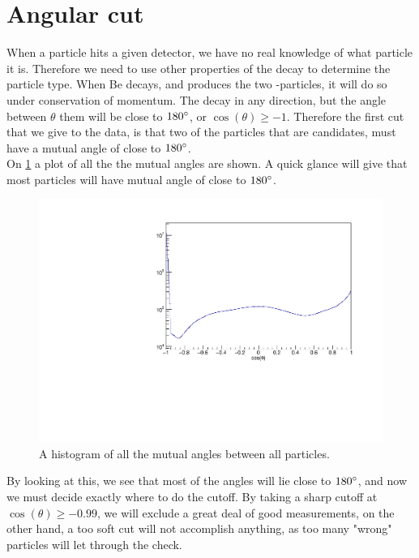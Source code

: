 \section{Angular cut}
When a particle hits a given detector, we have no real knowledge of what particle it is. 
Therefore we need to use other properties of the decay to determine the particle type. 
When \isotope[8][]Be decays, and produces the two \al-particles, it will do so under conservation of momentum. The decay in any direction, but the angle between $\theta$ them will be close to  $180\degree$, or $\cos(\theta) \geq -1$. Therefore the first cut that we give to the data, is that two of the particles that are \al candidates, must have a mutual angle of close to $180\degree$.\\


On \cref{fig:cosAll} a plot of all the the mutual angles are shown. A quick glance will give that most particles will have mutual angle of close to $180\degree$. 

\begin{figure}[h]
	\centering
	\includegraphics[width=\linewidth]{../figures/cosang.pdf}
	\caption{A histogram of all the mutual angles between all particles.}
	\label{fig:cosAll}
\end{figure}

By looking at this, we see that most of the angles will lie close to $180\degree$, and now we must decide exactly where to do the cutoff. 
By taking a sharp cutoff at $\cos(\theta) \geq -0.99$, we will exclude a great deal of good measurements, on the other hand, a too soft cut will not accomplish anything, as too many "wrong" particles will let through the check. 



